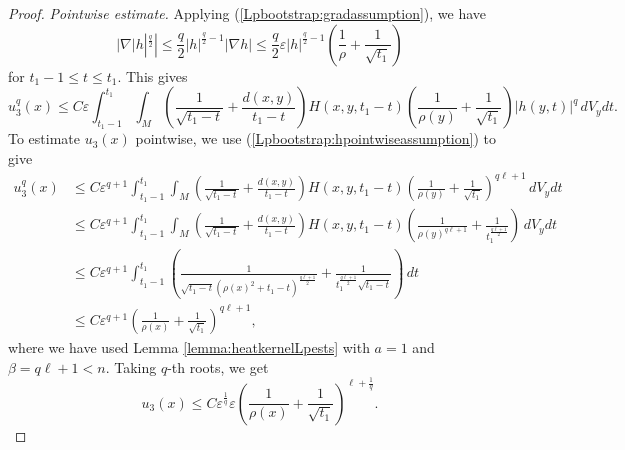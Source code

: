 \documentclass[12pt]{amsart}
\renewcommand{\1}{{\mathbf 1}}
\newcommand{\eps}{{\varepsilon}}
\theoremstyle{others}
\numberwithin{equation}{section}
\begin{document}
\begin{proof}
      \emph{Pointwise estimate.} Applying (\ref{Lpbootstrap:gradassumption}), we have
    $$| \nabla |h|^{\frac{q}{2}} | \leq \frac{q}{2} |h|^{\frac{q}{2} - 1} | \nabla h| \leq \frac{q}{2}\eps |h|^{\frac{q}{2} - 1} \left( \frac{1}{\rho} + \frac{1}{\sqrt{t_1}} \right)$$
    for $t_1 - 1 \leq t \leq t_1.$
    This gives
    \begin{equation}\label{u3firstbound}
       u^q_3(x) \leq C \eps \int_{t_1 - 1}^{t_1} \!\! \int_M \left( \frac{1}{\sqrt{t_1 - t}} + \frac{d(x,y) }{ t_1 - t } \right)H(x,y,t_1 - t) \left( \frac{1}{\rho(y)} + \frac{1}{\sqrt{t_1}} \right) |h(y,t)|^{q} \, dV_y dt.
       \end{equation}
    To estimate $u_3(x)$ pointwise, we use (\ref{Lpbootstrap:hpointwiseassumption}) to give
    \begin{equation*}
    \begin{split}
       u^q_3(x) & \leq C \eps^{q + 1} \int_{t_1 - 1}^{t_1} \!\! \int_M \left( \frac{1}{\sqrt{t_1 - t}} + \frac{d(x,y) }{ t_1 - t } \right)H(x,y,t_1 - t) \left( \frac{1}{\rho(y)} + \frac{1}{\sqrt{t_1}} \right)^{q\ell + 1}\, dV_y dt \\
       & \leq C \eps^{q + 1} \int_{t_1 - 1}^{t_1} \!\! \int_M \left( \frac{1}{\sqrt{t_1 - t}} + \frac{d(x,y) }{ t_1 - t } \right)H(x,y,t_1 - t) \left( \frac{1}{\rho(y)^{q\ell + 1}} + \frac{1}{t_1^{\frac{q\ell + 1}{2}} } \right) \, dV_y dt \\
        & \leq C \eps^{q + 1} \int_{t_1 - 1}^{t_1} \!\! \left( \frac{1}{\sqrt{t_1 - t} \left( \rho(x)^2 + t_1 - t \right)^{\frac{q \ell + 1}{2} } } + \frac{1}{t_1^{\frac{q\ell + 1}{2}} \sqrt{t_1 - t} } \right) \, dt \\
        & \leq C \eps^{q + 1} \left( \frac{1}{\rho(x)} + \frac{1}{\sqrt{t_1}} \right)^{q \ell + 1},
       \end{split}
       \end{equation*}
    where we have used Lemma \ref{lemma:heatkernelLpests} with $a = 1$ and $\beta = q \ell + 1 < n.$ Taking $q$-th roots, we get
    \begin{equation}\label{u3xest}
        u_3(x) \leq C \eps^{\frac{1}{q}} \eps \left( \frac{1}{\rho(x)} + \frac{1}{\sqrt{t_1}} \right)^{\ell + \frac{1}{q} }.
    \end{equation}
    

\end{proof}
\end{document}

